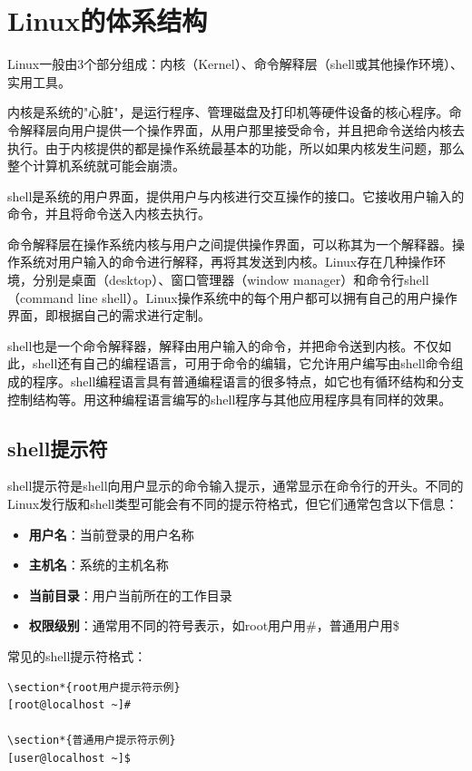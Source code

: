 \documentclass[12pt,UTF8]{ctexbook}
\begin{document}
\section{Linux的体系结构}
Linux一般由3个部分组成：内核（Kernel）、命令解释层（shell或其他操作环境）、实用工具。

内核是系统的"心脏"，是运行程序、管理磁盘及打印机等硬件设备的核心程序。命令解释层向用户提供一个操作界面，从用户那里接受命令，并且把命令送给内核去执行。由于内核提供的都是操作系统最基本的功能，所以如果内核发生问题，那么整个计算机系统就可能会崩溃。

shell是系统的用户界面，提供用户与内核进行交互操作的接口。它接收用户输入的命令，并且将命令送入内核去执行。

命令解释层在操作系统内核与用户之间提供操作界面，可以称其为一个解释器。操作系统对用户输入的命令进行解释，再将其发送到内核。Linux存在几种操作环境，分别是桌面（desktop）、窗口管理器（window manager）和命令行shell（command line shell）。Linux操作系统中的每个用户都可以拥有自己的用户操作界面，即根据自己的需求进行定制。

shell也是一个命令解释器，解释由用户输入的命令，并把命令送到内核。不仅如此，shell还有自己的编程语言，可用于命令的编辑，它允许用户编写由shell命令组成的程序。shell编程语言具有普通编程语言的很多特点，如它也有循环结构和分支控制结构等。用这种编程语言编写的shell程序与其他应用程序具有同样的效果。

\subsection{shell提示符}
shell提示符是shell向用户显示的命令输入提示，通常显示在命令行的开头。不同的Linux发行版和shell类型可能会有不同的提示符格式，但它们通常包含以下信息：

\begin{itemize}
    \item \textbf{用户名}：当前登录的用户名称
    \item \textbf{主机名}：系统的主机名称
    \item \textbf{当前目录}：用户当前所在的工作目录
    \item \textbf{权限级别}：通常用不同的符号表示，如root用户用\#，普通用户用\$
\end{itemize}

常见的shell提示符格式：
\begin{verbatim}
\section*{root用户提示符示例}
[root@localhost ~]#

\section*{普通用户提示符示例}
[user@localhost ~]$
\end{verbatim}
\end{document}

